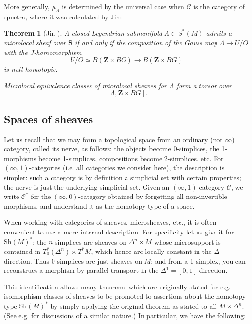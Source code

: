 \documentclass[12pt,a4paper]{article}
\numberwithin{equation}{section}
\newtheorem{thm}[equation]{Theorem}
\theoremstyle{definition}
\theoremstyle{remark}
\newcommand{\Z}{\mathbf{Z}}
\newcommand{\Sh}{\mathrm{Sh}}
\renewcommand{\S}{\mathbf{S}}
\begin{document}
More generally, $\mu_\Lambda$ is determined by the universal case when $\mathcal{C}$ is the category of spectra, where it was calculated by Jin:

\begin{thm}[Jin \cite{Jin}]
A closed Legendrian submanifold $\Lambda \subset S^*(M)$ admits a microlocal sheaf over $\S$
if and only if the composition of the Gauss map $\Lambda\to U/O$ with the $J$-homomorphism
\[U/O\simeq B(\Z\times BO) \to B(\Z\times BG)\]
is null-homotopic.

Microlocal equivalence classes of microlocal sheaves for $\Lambda$ form a torsor over
\[[\Lambda, \Z\times BG].\]
\end{thm}


\subsection{Spaces of sheaves}

Let us recall that we may form a topological space from an ordinary (not $\infty$) category, called its nerve, as follows: the objects become 0-simplices, the 1-morphisms become 1-simplices, compositions become 2-simplices, etc.  For $(\infty,1)$-categories (i.e. all categories we consider here), the description is simpler: such a category is by definition a simplicial set with certain properties; the nerve is just the underlying simplicial set.  Given an $(\infty, 1)$-category $\mathcal{C}$, we write $\mathcal{C}^*$ for the $(\infty,0)$-category obtained by forgetting all non-invertible morphisms, and understand it as the homotopy type of a space.

When working with categories of sheaves, microsheaves, etc., it is often convenient to use a more internal description.  For specificity let us give it for $\Sh(M)^*$: the  $n$-simplices are sheaves on $\Delta^n \times M$ whose microsupport is contained in $T^*_0(\Delta^n) \times T^*M$, which hence are locally constant in the $\Delta$ direction.  Thus 0-simplices are just sheaves on $M$; and from a 1-simplex, you can reconstruct a morphism by parallel transport in the $\Delta^1 = [0,1]$ direction.

This identification allows many theorems which are originally stated for e.g. isomorphism classes of sheaves to be promoted to assertions about the homotopy type $\Sh(M)^*$ by simply applying the original theorem as stated to all $M \times \Delta^n$.  (See e.g. \cite{li-nadler-shende} for  discussions of a similar nature.)
In particular, we have the following:
\end{document}
